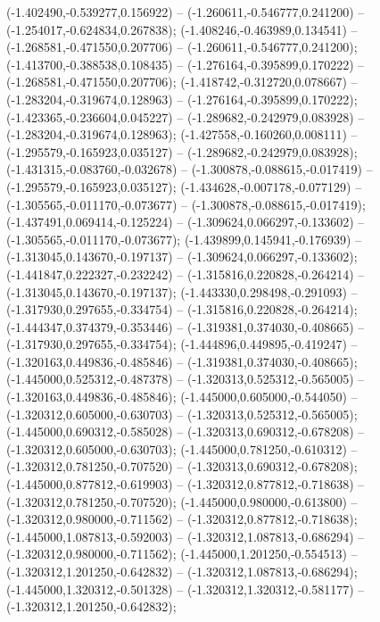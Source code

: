  (-1.402490,-0.539277,0.156922) -- (-1.260611,-0.546777,0.241200) -- (-1.254017,-0.624834,0.267838);
 (-1.408246,-0.463989,0.134541) -- (-1.268581,-0.471550,0.207706) -- (-1.260611,-0.546777,0.241200);
 (-1.413700,-0.388538,0.108435) -- (-1.276164,-0.395899,0.170222) -- (-1.268581,-0.471550,0.207706);
 (-1.418742,-0.312720,0.078667) -- (-1.283204,-0.319674,0.128963) -- (-1.276164,-0.395899,0.170222);
 (-1.423365,-0.236604,0.045227) -- (-1.289682,-0.242979,0.083928) -- (-1.283204,-0.319674,0.128963);
 (-1.427558,-0.160260,0.008111) -- (-1.295579,-0.165923,0.035127) -- (-1.289682,-0.242979,0.083928);
 (-1.431315,-0.083760,-0.032678) -- (-1.300878,-0.088615,-0.017419) -- (-1.295579,-0.165923,0.035127);
 (-1.434628,-0.007178,-0.077129) -- (-1.305565,-0.011170,-0.073677) -- (-1.300878,-0.088615,-0.017419);
 (-1.437491,0.069414,-0.125224) -- (-1.309624,0.066297,-0.133602) -- (-1.305565,-0.011170,-0.073677);
 (-1.439899,0.145941,-0.176939) -- (-1.313045,0.143670,-0.197137) -- (-1.309624,0.066297,-0.133602);
 (-1.441847,0.222327,-0.232242) -- (-1.315816,0.220828,-0.264214) -- (-1.313045,0.143670,-0.197137);
 (-1.443330,0.298498,-0.291093) -- (-1.317930,0.297655,-0.334754) -- (-1.315816,0.220828,-0.264214);
 (-1.444347,0.374379,-0.353446) -- (-1.319381,0.374030,-0.408665) -- (-1.317930,0.297655,-0.334754);
 (-1.444896,0.449895,-0.419247) -- (-1.320163,0.449836,-0.485846) -- (-1.319381,0.374030,-0.408665);
 (-1.445000,0.525312,-0.487378) -- (-1.320313,0.525312,-0.565005) -- (-1.320163,0.449836,-0.485846);
 (-1.445000,0.605000,-0.544050) -- (-1.320312,0.605000,-0.630703) -- (-1.320313,0.525312,-0.565005);
 (-1.445000,0.690312,-0.585028) -- (-1.320313,0.690312,-0.678208) -- (-1.320312,0.605000,-0.630703);
 (-1.445000,0.781250,-0.610312) -- (-1.320312,0.781250,-0.707520) -- (-1.320313,0.690312,-0.678208);
 (-1.445000,0.877812,-0.619903) -- (-1.320312,0.877812,-0.718638) -- (-1.320312,0.781250,-0.707520);
 (-1.445000,0.980000,-0.613800) -- (-1.320312,0.980000,-0.711562) -- (-1.320312,0.877812,-0.718638);
 (-1.445000,1.087813,-0.592003) -- (-1.320312,1.087813,-0.686294) -- (-1.320312,0.980000,-0.711562);
 (-1.445000,1.201250,-0.554513) -- (-1.320312,1.201250,-0.642832) -- (-1.320312,1.087813,-0.686294);
 (-1.445000,1.320312,-0.501328) -- (-1.320312,1.320312,-0.581177) -- (-1.320312,1.201250,-0.642832);
